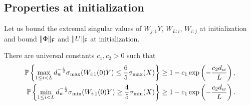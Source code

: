 \subsection{Properties at initialization}
\label{sec:subsec:Properties at initialization}
Let us bound the extremal singular values of $W_{j:1}Y$, $W_{L:i}$, $W_{i:j}$ at initialization and bound $\lVert\Phi\rVert_{\mathsf{F}}$ and $\lVert U\rVert_{\mathsf{F}}$ at initialization.
\begin{lemma}	\label{lemma:restricted-singular-values}
	There are universal constants $c_1, c_2 > 0$ such that 
	\begin{subequations}
		\begin{align*}
			\mathbb{P}\left\{ {\max_{1 \leq i < L} d_{w}^{-\frac{i}{2}} \sigma_{\max}(W_{i:1}(0) Y) \leq \frac{6}{5} \sigma_{\max}(X)} \right\}
			 & \geq 1 - c_1 \exp\left(-\frac{c_2 d_{w}}{L} \right), \\
			\mathbb{P}\left\{ {\min_{1 \leq i < L} d_{w}^{-\frac{i}{2}} \sigma_{\min}(W_{i:1}(0) Y) \geq \frac{4}{5} \sigma_{\min}(X)} \right\}
			 & \geq 1 - c_1 \exp\left(-\frac{c_2 d_{w}}{L} \right).
		\end{align*}
	\end{subequations}
\end{lemma}
